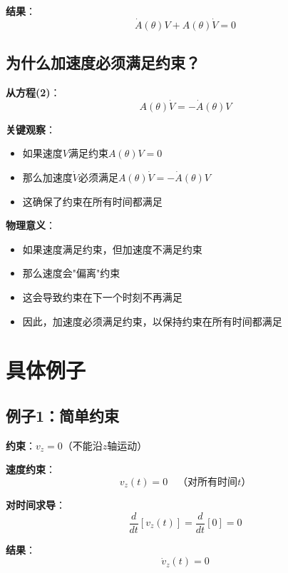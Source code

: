 \documentclass[12pt,a4paper]{article}
\begin{document}
\textbf{结果}：
\begin{equation}
\dot{A}(\theta)V + A(\theta)\dot{V} = 0 \tag{2}
\end{equation}

\subsection{为什么加速度必须满足约束？}

\textbf{从方程(2)}：
\begin{equation}
A(\theta)\dot{V} = -\dot{A}(\theta)V
\end{equation}

\textbf{关键观察}：
\begin{itemize}
\item 如果速度$V$满足约束$A(\theta)V = 0$
\item 那么加速度$\dot{V}$必须满足$A(\theta)\dot{V} = -\dot{A}(\theta)V$
\item 这确保了约束在所有时间都满足
\end{itemize}

\textbf{物理意义}：
\begin{itemize}
\item 如果速度满足约束，但加速度不满足约束
\item 那么速度会"偏离"约束
\item 这会导致约束在下一个时刻不再满足
\item 因此，加速度必须满足约束，以保持约束在所有时间都满足
\end{itemize}

\section{具体例子}

\subsection{例子1：简单约束}

\textbf{约束}：$v_z = 0$（不能沿$z$轴运动）

\textbf{速度约束}：
\begin{equation}
v_z(t) = 0 \quad \text{（对所有时间$t$）}
\end{equation}

\textbf{对时间求导}：
\begin{equation}
\frac{d}{dt}[v_z(t)] = \frac{d}{dt}[0] = 0
\end{equation}

\textbf{结果}：
\begin{equation}
\dot{v}_z(t) = 0
\end{equation}
\end{document}
